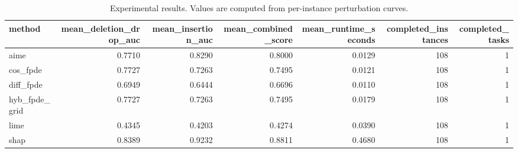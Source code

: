 \begin{table}[t]
\caption{Experimental results. Values are computed from per-instance perturbation curves.}
\label{tab:main_results_computed}
\centering
\begin{tabular}{lrrrrrr}
\toprule
method & mean\_deletion\_drop\_auc & mean\_insertion\_auc & mean\_combined\_score & mean\_runtime\_seconds & completed\_instances & completed\_tasks \\
\midrule
aime & 0.7710 & 0.8290 & 0.8000 & 0.0129 & 108 & 1 \\
cos\_fpde & 0.7727 & 0.7263 & 0.7495 & 0.0121 & 108 & 1 \\
diff\_fpde & 0.6949 & 0.6444 & 0.6696 & 0.0110 & 108 & 1 \\
hyb\_fpde\_grid & 0.7727 & 0.7263 & 0.7495 & 0.0179 & 108 & 1 \\
lime & 0.4345 & 0.4203 & 0.4274 & 0.0390 & 108 & 1 \\
shap & 0.8389 & 0.9232 & 0.8811 & 0.4680 & 108 & 1 \\
\bottomrule
\end{tabular}

\end{table}

